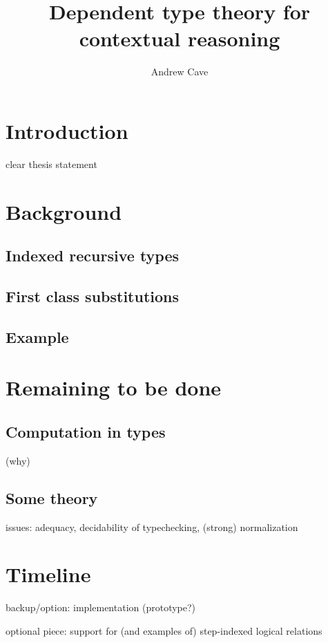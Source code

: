 \documentclass{article}
\author{Andrew Cave}
\title{Dependent type theory for contextual reasoning}
\begin{document}
\maketitle

\section{Introduction}
clear thesis statement
\section{Background}
\subsection{Indexed recursive types}

\subsection{First class substitutions}

\subsection{Example}
\section{Remaining to be done}
\subsection{Computation in types}
(why)

\subsection{Some theory}

issues: adequacy, decidability of typechecking, (strong) normalization
\section{Timeline}
backup/option: implementation (prototype?)

optional piece: support for (and examples of) step-indexed logical relations
\end{document}
